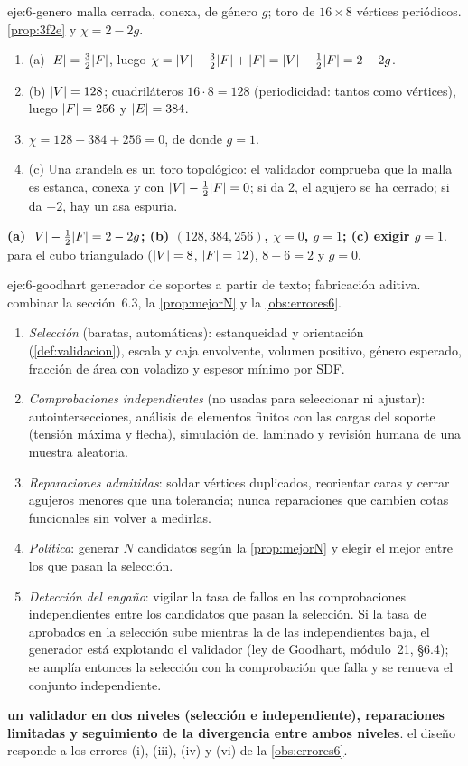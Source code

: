 \begin{solucion}{eje:6-genero}
\datos malla cerrada, conexa, de género $g$; toro de $16\times 8$ vértices periódicos.
\planteamiento \cref{prop:3f2e} y $\chi=2-2g$.
\pasos
\begin{enumerate}[label=\arabic*.]
  \item (a) $\lvert E\rvert=\tfrac32\lvert F\rvert$, luego $\chi=\lvert V\rvert-\tfrac32\lvert F\rvert+\lvert F\rvert=\lvert V\rvert-\tfrac12\lvert F\rvert=2-2g$.
  \item (b) $\lvert V\rvert=128$; cuadriláteros $16\cdot 8=128$ (periodicidad: tantos como vértices), luego $\lvert F\rvert=256$ y $\lvert E\rvert=384$.
  \item $\chi=128-384+256=0$, de donde $g=1$.
  \item (c) Una arandela es un toro topológico: el validador comprueba que la malla es estanca, conexa y con $\lvert V\rvert-\tfrac12\lvert F\rvert=0$; si da 2, el agujero se ha cerrado; si da $-2$, hay un asa espuria.
\end{enumerate}
\resultado \textbf{(a) $\lvert V\rvert-\tfrac12\lvert F\rvert=2-2g$; (b) $(128,384,256)$, $\chi=0$, $g=1$; (c) exigir $g=1$}.
\comprobacion para el cubo triangulado ($\lvert V\rvert=8$, $\lvert F\rvert=12$), $8-6=2$ y $g=0$.
\end{solucion}

\begin{solucion}{eje:6-goodhart}
\datos generador de soportes a partir de texto; fabricación aditiva.
\planteamiento combinar la sección~6.3, la \cref{prop:mejorN} y la \cref{obs:errores6}.
\pasos
\begin{enumerate}[label=\arabic*.]
  \item \emph{Selección} (baratas, automáticas): estanqueidad y orientación (\cref{def:validacion}), escala y caja envolvente, volumen positivo, género esperado, fracción de área con voladizo y espesor mínimo por SDF.
  \item \emph{Comprobaciones independientes} (no usadas para seleccionar ni ajustar): autointersecciones, análisis de elementos finitos con las cargas del soporte (tensión máxima y flecha), simulación del laminado y revisión humana de una muestra aleatoria.
  \item \emph{Reparaciones admitidas}: soldar vértices duplicados, reorientar caras y cerrar agujeros menores que una tolerancia; nunca reparaciones que cambien cotas funcionales sin volver a medirlas.
  \item \emph{Política}: generar $N$ candidatos según la \cref{prop:mejorN} y elegir el mejor entre los que pasan la selección.
  \item \emph{Detección del engaño}: vigilar la tasa de fallos en las comprobaciones independientes entre los candidatos que pasan la selección. Si la tasa de aprobados en la selección sube mientras la de las independientes baja, el generador está explotando el validador (ley de Goodhart, módulo~21, §6.4); se amplía entonces la selección con la comprobación que falla y se renueva el conjunto independiente.
\end{enumerate}
\resultado \textbf{un validador en dos niveles (selección e independiente), reparaciones limitadas y seguimiento de la divergencia entre ambos niveles}.
\comprobacion el diseño responde a los errores (i), (iii), (iv) y (vi) de la \cref{obs:errores6}.
\end{solucion}
